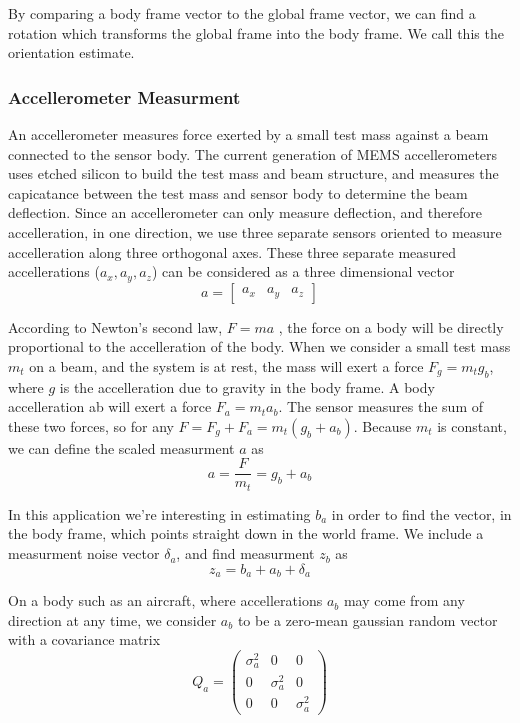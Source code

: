 \documentclass[12pt]{report}
\begin{document}
By comparing a body frame vector to the global frame vector, we can find a rotation which transforms the global frame into the body frame. We call this the orientation estimate.  

\subsubsection{Accellerometer Measurment}

An accellerometer measures force exerted by a small test mass against a beam connected to the sensor body. The current generation of MEMS accellerometers uses etched silicon to build the test mass and beam structure, and measures the capicatance between the test mass and sensor body to determine the beam deflection. Since an accellerometer can only measure deflection, and therefore accelleration, in one direction, we use three separate sensors oriented to measure accelleration along three orthogonal axes. These three separate measured accellerations ($a_x, a_y, a_z$) can be considered as a three dimensional vector 
\begin{equation} \label{eq:defa}
  a = \begin{bmatrix}a_x&a_y&a_z \end{bmatrix}
\end{equation}

According to Newton's second law, $F = m a$ , the force on a body will be directly proportional to the accelleration of the body. When we consider a small test mass $m_t$ on a beam, and the system is at rest, the mass will exert a force $F_g = m_t g_b$, where $g$ is the accelleration due to gravity in the body frame. A body accelleration ab will exert a force $F_a = m_t a_b$. The sensor measures the sum of these two forces, so for any $F = F_g + F_a = m_t ( g_b + a_b )$. Because $m_t$ is constant, we can define the scaled measurment $a$ as 
\begin{equation} \label{eq:defza}
  a = \frac{F}{m_t} = g_b + a_b
\end{equation} 
 
In this application we're interesting in estimating $b_a$ in order to find the vector, in the body frame, which points straight down in the world frame. We include a measurment noise vector $\delta_a$, and find measurment $z_b$ as
\begin{equation} \label{eq:findgb}
  z_a = b_a + a_b + \delta_a
\end{equation}

On a body such as an aircraft, where accellerations $a_b$ may come from any direction at any time, we consider $a_b$ to be a zero-mean gaussian random vector with a covariance matrix 
\begin{equation} \label{eq:Qa}
  Q_a = \begin{pmatrix} \sigma_a^2 & 0 & 0 \\
	                      0 & \sigma_a^2 & 0 \\ 
	                      0 & 0 & \sigma_a^2 \end{pmatrix} 
\end{equation}
\end{document}
